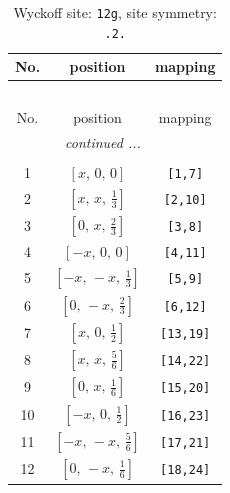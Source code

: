 \documentclass[fleqn,8pt]{jsarticle}
\begin{document}
\begin{longtable}{ccc}
\caption{Wyckoff site: {\tt 12g}, site symmetry: {\tt .2.}}
 \\
 \hline \hline
No. & position & mapping \\ \hline \endfirsthead

\multicolumn{2}{l}{\tablename\ \thetable{}} \\
 \hline \hline
No. & position & mapping \\ \hline \endhead

 \hline \hline
\multicolumn{2}{r}{\footnotesize\it continued ...} \\ \endfoot

 \hline \hline
\multicolumn{2}{r}{} \\ \endlastfoot

1 & $\left[ x,\, 0,\, 0 \right]$ & {\tt [1,7]} \\ \hline
2 & $\left[ x,\, x,\, \frac{1}{3} \right]$ & {\tt [2,10]} \\ \hline
3 & $\left[ 0,\, x,\, \frac{2}{3} \right]$ & {\tt [3,8]} \\ \hline
4 & $\left[ - x,\, 0,\, 0 \right]$ & {\tt [4,11]} \\ \hline
5 & $\left[ - x,\, - x,\, \frac{1}{3} \right]$ & {\tt [5,9]} \\ \hline
6 & $\left[ 0,\, - x,\, \frac{2}{3} \right]$ & {\tt [6,12]} \\ \hline
7 & $\left[ x,\, 0,\, \frac{1}{2} \right]$ & {\tt [13,19]} \\ \hline
8 & $\left[ x,\, x,\, \frac{5}{6} \right]$ & {\tt [14,22]} \\ \hline
9 & $\left[ 0,\, x,\, \frac{1}{6} \right]$ & {\tt [15,20]} \\ \hline
10 & $\left[ - x,\, 0,\, \frac{1}{2} \right]$ & {\tt [16,23]} \\ \hline
11 & $\left[ - x,\, - x,\, \frac{5}{6} \right]$ & {\tt [17,21]} \\ \hline
12 & $\left[ 0,\, - x,\, \frac{1}{6} \right]$ & {\tt [18,24]} \\
\end{longtable}
\renewcommand{\arraystretch}{1.2}
\end{document}
